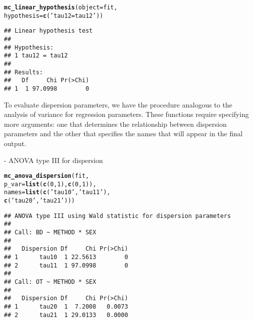 \documentclass[article]{jss}\usepackage[]{graphicx}\usepackage[]{xcolor}
\makeatletter
\newcommand{\hlnum}[1]{\textcolor[rgb]{0.686,0.059,0.569}{#1}}%
\newcommand{\hlstr}[1]{\textcolor[rgb]{0.192,0.494,0.8}{#1}}%
\newcommand{\hlstd}[1]{\textcolor[rgb]{0.345,0.345,0.345}{#1}}%
\newcommand{\hlkwc}[1]{\textcolor[rgb]{0.333,0.667,0.333}{#1}}%
\newcommand{\hlkwd}[1]{\textcolor[rgb]{0.737,0.353,0.396}{\textbf{#1}}}%
\newenvironment{kframe}{%
 \def\at@end@of@kframe{}%
 \ifinner\ifhmode%
  \def\at@end@of@kframe{\end{minipage}}%
  \begin{minipage}{\columnwidth}%
 \fi\fi%
 \def\FrameCommand##1{\hskip\@totalleftmargin \hskip-\fboxsep
 \colorbox{shadecolor}{##1}\hskip-\fboxsep
     \hskip-\linewidth \hskip-\@totalleftmargin \hskip\columnwidth}%
 \MakeFramed {\advance\hsize-\width
   \@totalleftmargin\z@ \linewidth\hsize
   \@setminipage}}%
 {\par\unskip\endMakeFramed%
 \at@end@of@kframe}
\newenvironment{knitrout}{}{} %
\makeatother
\begin{document}
\begin{knitrout}
\color{fgcolor}\begin{kframe}
\begin{alltt}
\hlkwd{mc_linear_hypothesis}\hlstd{(}\hlkwc{object} \hlstd{=  fit,}
                     \hlkwc{hypothesis} \hlstd{=} \hlkwd{c}\hlstd{(}\hlstr{'tau12 = tau12'}\hlstd{))}
\end{alltt}
\begin{verbatim}
## Linear hypothesis test
## 
## Hypothesis:               
## 1 tau12 = tau12
## 
## Results:
##   Df     Chi Pr(>Chi)
## 1  1 97.0998        0
\end{verbatim}
\end{kframe}
\end{knitrout}

To evaluate dispersion parameters, we have the procedure analogous to the analysis of variance for regression parameters. These functions require specifying more arguments: one that determines the relationship between dispersion parameters and the other that specifies the names that will appear in the final output.

 - ANOVA type III for dispersion

\begin{knitrout}
\color{fgcolor}\begin{kframe}
\begin{alltt}
\hlkwd{mc_anova_dispersion}\hlstd{(fit,}
                    \hlkwc{p_var} \hlstd{=} \hlkwd{list}\hlstd{(}\hlkwd{c}\hlstd{(}\hlnum{0}\hlstd{,}\hlnum{1}\hlstd{),} \hlkwd{c}\hlstd{(}\hlnum{0}\hlstd{,}\hlnum{1}\hlstd{)),}
                    \hlkwc{names} \hlstd{=} \hlkwd{list}\hlstd{(}\hlkwd{c}\hlstd{(}\hlstr{'tau10'}\hlstd{,} \hlstr{'tau11'}\hlstd{),}
                                 \hlkwd{c}\hlstd{(}\hlstr{'tau20'}\hlstd{,} \hlstr{'tau21'}\hlstd{)))}
\end{alltt}
\begin{verbatim}
## ANOVA type III using Wald statistic for dispersion parameters
## 
## Call: BD ~ METHOD * SEX
## 
##   Dispersion Df     Chi Pr(>Chi)
## 1      tau10  1 22.5613        0
## 2      tau11  1 97.0998        0
## 
## Call: OT ~ METHOD * SEX
## 
##   Dispersion Df     Chi Pr(>Chi)
## 1      tau20  1  7.2008   0.0073
## 2      tau21  1 29.0133   0.0000
\end{verbatim}
\end{kframe}
\end{knitrout}
\end{document}
